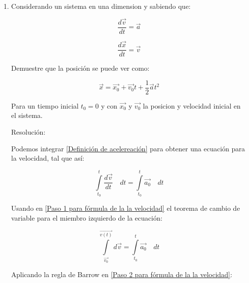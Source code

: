 \documentclass[12pt,letterpaper]{article}
\begin{document}
\begin{enumerate}

    \item Considerando un sistema en una dimension y sabiendo que:
    
        \begin{equation}
            \label{Definición de acelereación}
            \frac{d\vec{v}}{dt}=\vec{a}
        \end{equation}
        
        \begin{equation}
            \label{Definición de velocidad}
            \frac{d\vec{x}}{dt}=\vec{v}
        \end{equation}
    
    Demuestre que la posición se puede ver como:

        \begin{equation}
            \label{Ec obj}
            \vec{x}=\vec{x_{0}}+\vec{v_{0}}t+\frac{1}{2}\vec{a}t^{2}
        \end{equation}

    Para un tiempo inicial $t_{0}=0$ y con $\vec{x_{0}}$ y $\vec{v_{0}}$ la posicion y velocidad inicial en el sistema.\newline

    Resolución:\newline
    
    Podemos integrar \ref{Definición de acelereación} para obtener una ecuación para la velocidad, tal que así:

        \begin{equation}
            \label{Paso 1 para fórmula de la la velocidad}
            \int \limits_{t_{0}}^{t} \frac{d\vec{v}}{dt}\quad dt
            =
            \int \limits_{t_{0}}^{t} \vec{a_{0}}\quad dt
        \end{equation}
    
    Usando en \ref{Paso 1 para fórmula de la la velocidad} el teorema de cambio de variable para el miembro izquierdo de la ecuación:
    
        \begin{equation}
            \label{Paso 2 para fórmula de la la velocidad}
            \int \limits_{\vec{v_{0}}}^{\vec{v(t)}} d\vec{v}
            =
            \int \limits_{t_{0}}^{t} \vec{a_{0}}\quad dt
        \end{equation}

    Aplicando la regla de Barrow en \ref{Paso 2 para fórmula de la la velocidad}:


\end{enumerate}
\end{document}
